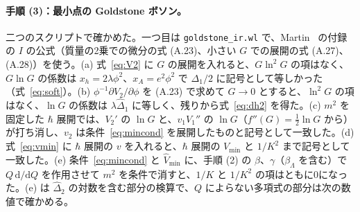 \documentclass[a4paper,10pt]{ltjsarticle}
\newcommand{\dd}{\mathrm{d}}
\begin{document}
\paragraph{手順 (3)：最小点の Goldstone ボソン。}二つのスクリプトで確かめた。一つ目は \texttt{goldstone\_ir.wl} で、Martin~\cite{martin14} の付録の $I$ の公式（質量の2乗での微分の式 (A.23)、小さい $G$ での展開の式 (A.27)、(A.28)）を使う。(a) 式~\eqref{eq:V2} に $G$ の展開を入れると、$G\ln^2G$ の項はなく、$G\ln G$ の係数は $x_h=2\lambda\phi^2$、$x_A=e^2\phi^2$ で $\Delta_1/2$ に記号として等しかった（式~\eqref{eq:soft}）。(b) $\phi^{-1}\partial V_2/\partial\phi$ を (A.23) で求めて $G\to0$ とすると、$\ln^2G$ の項はなく、$\ln G$ の係数は $\lambda\hat\Delta_1$ に等しく、残りから式~\eqref{eq:dh2} を得た。(c) $m^2$ を固定した $\hbar$ 展開では、$V_2'$ の $\ln G$ と、$v_1V_1''$ の $\ln G$（$f''(G)=\frac12\ln G$ から）が打ち消し、$v_2$ は条件~\eqref{eq:mincond} を展開したものと記号として一致した。(d) 式~\eqref{eq:vmin} に $\hbar$ 展開の $v$ を入れると、$\hbar$ 展開の $V_{\min}$ と $1/K^2$ まで記号として一致した。(e) 条件~\eqref{eq:mincond} と $\hat V_{\min}$ に、手順 (2) の $\beta$、$\gamma$（$\beta_\Lambda$ を含む）で $Q\,\dd/\dd Q$ を作用させて $m^2$ を条件で消すと、$1/K$ と $1/K^2$ の項はともに0になった。(e) は $\hat\Delta_2$ の対数を含む部分の検算で、$Q$ によらない多項式の部分は次の数値で確かめる。
\end{document}
